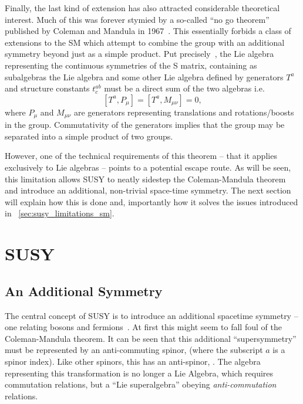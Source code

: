 Finally, the last kind of extension has also attracted considerable theoretical
interest. Much of this was forever stymied by a so-called ``no go theorem''
published by Coleman and Mandula in 1967~\cite{coleman_mandula}. This
essentially forbids a class of extensions to the \ac{SM} which attempt to
combine the \Poincare group with an additional symmetry beyond just as a simple
product. Put precisely~\cite{sparticles}, the Lie algebra representing the
continuous symmetries of the S matrix, containing as subalgebras the \Poincare
Lie algebra and some other Lie algebra defined by generators $T^a$ and structure
constants $t^{ab}_c$ must be a direct sum of the two algebras i.e.
\begin{equation*}
\left[T^a, P_{\mu}\right] = \left[T^a, M_{\mu\nu}\right] = 0,
\end{equation*}
where $P_{\mu}$ and $M_{\mu\nu}$ are generators representing translations and
rotations/boosts in the \Poincare group. Commutativity of the generators implies
that the group may be separated into a simple product of two groups.

However, one of the technical requirements of this theorem -- that it applies
exclusively to Lie algebras -- points to a potential escape route. As will be
seen, this limitation allows \acf{SUSY} to neatly sidestep the Coleman-Mandula
theorem and introduce an additional, non-trivial space-time symmetry. The next
section will explain how this is done and, importantly how it solves the issues
introduced in \sec~\ref{sec:susy_limitations_sm}.

\section{\acl{SUSY}}
\subsection{An Additional Symmetry}
The central concept of \ac{SUSY} is to introduce an additional spacetime
symmetry -- one relating bosons and fermions~\cite{sparticles}. At first this
might seem to fall foul of the Coleman-Mandula theorem. It can be seen that this
additional ``supersymmetry'' must be represented by an anti-commuting spinor, \Qa
(where the subscript $a$ is a spinor index). Like other spinors, this has an
anti-spinor, \AQa. The algebra representing this transformation is no longer a
Lie Algebra, which requires commutation relations, but a ``Lie superalgebra''
obeying \emph{anti-commutation} relations.

